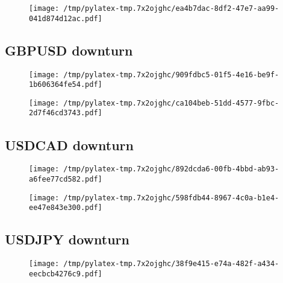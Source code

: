 \documentclass{article}%
\begin{document}
%


\begin{figure}[htbp]%
\centering%
\texttt{[image: /tmp/pylatex-tmp.7x2ojghc/ea4b7dac-8df2-47e7-aa99-041d874d12ac.pdf]}%
\end{figure}

%
\newpage %
\subsection{GBPUSD downturn}%
\label{subsec:GBPUSDdownturn}%


\begin{figure}[htbp]%
\centering%
\texttt{[image: /tmp/pylatex-tmp.7x2ojghc/909fdbc5-01f5-4e16-be9f-1b606364fe54.pdf]}%
\end{figure}

%


\begin{figure}[htbp]%
\centering%
\texttt{[image: /tmp/pylatex-tmp.7x2ojghc/ca104beb-51dd-4577-9fbc-2d7f46cd3743.pdf]}%
\end{figure}

%
\newpage %
\subsection{USDCAD downturn}%
\label{subsec:USDCADdownturn}%


\begin{figure}[htbp]%
\centering%
\texttt{[image: /tmp/pylatex-tmp.7x2ojghc/892dcda6-00fb-4bbd-ab93-a6fee77cd582.pdf]}%
\end{figure}

%


\begin{figure}[htbp]%
\centering%
\texttt{[image: /tmp/pylatex-tmp.7x2ojghc/598fdb44-8967-4c0a-b1e4-ee47e843e300.pdf]}%
\end{figure}

%
\newpage %
\subsection{USDJPY downturn}%
\label{subsec:USDJPYdownturn}%


\begin{figure}[htbp]%
\centering%
\texttt{[image: /tmp/pylatex-tmp.7x2ojghc/38f9e415-e74a-482f-a434-eecbcb4276c9.pdf]}%
\end{figure}
\end{document}
